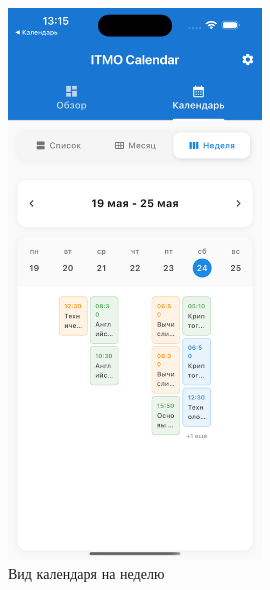 \begin{figure}[h!]
    \centering
    \includegraphics[width=0.6\textwidth]{images/calendar-week.png}
    \caption{Вид календаря на неделю}
    \label{fig:calendar-week}
\end{figure}

